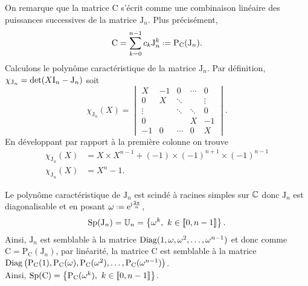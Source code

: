 \begin{preuve}
    On remarque que la matrice $\mathrm{C}$ s'écrit comme une combinaison linéaire des puissances successives de la matrice $\mathrm{J}_n$. Plus précisément, 
    $$\mathrm{C} = \sum_{k=0}^{n-1} c_k \mathrm{J}_n^k \defeq \mathrm{P}_{\mathrm{C}}(\mathrm{J}_n).$$
    Calculons le polynôme caractéristique de la matrice $\mathrm{J}_n$. Par définition, $\chi_{\mathrm{J}_n} = \det(X \mathrm{I}_n - \mathrm{J}_n)$ soit 
    $$
        \chi_{\mathrm{J}_n}(X) = 
        \begin{vmatrix}
        X & -1 & 0 & \cdots & 0 \\
        0 & X & \ddots & & \vdots \\
        \vdots & & \ddots & \ddots & 0 \\
        0 & & & X & -1 \\
        -1 & 0 & \cdots & 0 & X
        \end{vmatrix}.
    $$
    En développant par rapport à la première colonne on trouve
    \begin{align*}
        \chi_{\mathrm{J}_n}(X) &= X \times X^{n-1} + (-1) \times (-1)^{n+1} \times (-1)^{n-1} \\
        \chi_{\mathrm{J}_n}(X) &= X^n-1.
    \end{align*}
    
    Le polynôme caractéristique de $\mathrm{J}_n$ est scindé à racines simples sur $\mathbb{C}$ donc $\mathrm{J}_n$ est diagonalisable et en posant $\omega \defeq \me^{\mi \frac{2 \pi}{n}}$, 
    $$\mathrm{Sp}(\mathrm{J}_n) = \mathbb{U}_n = \left \{ \omega^k,\ k \in \llbracket 0, n-1 \rrbracket \right \}.$$
    Ainsi, $\mathrm{J}_n$ est semblable à la matrice $\mathrm{Diag}(1, \omega, \omega^2, \dots, \omega^{n-1})$ et donc comme $\mathrm{C} = \mathrm{P}_{\mathrm{C}}(\mathrm{J}_n)$, par linéarité, la matrice $\mathrm{C}$ est semblable à  la matrice $\mathrm{Diag} \left(\mathrm{P}_\mathrm{C}(1), \mathrm{P}_\mathrm{C}(\omega), \mathrm{P}_\mathrm{C}(\omega^2), \dots,\mathrm{P}_\mathrm{C}(\omega^{n-1}) \right)$. \\
    Ainsi, $\mathrm{Sp}(\mathrm{C}) = \left \{ \mathrm{P}_\mathrm{C}(\omega^k),\ k \in \llbracket 0, n-1 \rrbracket \right \}$.
\end{preuve}    


